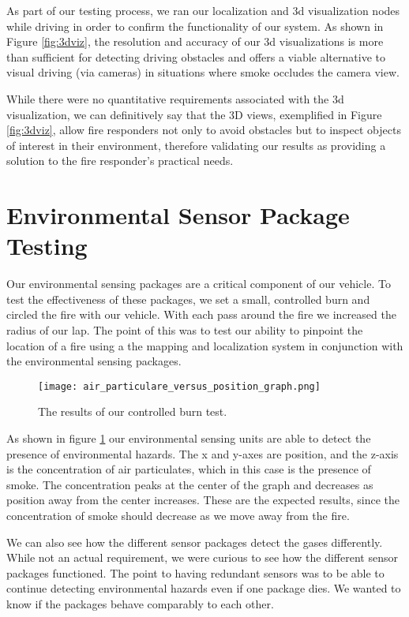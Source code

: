 As part of our testing process, we ran our localization and 3d visualization nodes while driving in order to confirm the functionality of our system. As shown in Figure \ref{fig:3dviz}, the resolution and accuracy of our 3d visualizations is more than sufficient for detecting driving obstacles and offers a viable alternative to visual driving (via cameras) in situations where smoke occludes the camera view.

While there were no quantitative requirements associated with the 3d visualization, we can definitively say that the 3D views, exemplified in Figure \ref{fig:3dviz}, allow fire responders not only to avoid obstacles but to inspect objects of interest in their environment, therefore validating our results as providing a solution to the fire responder's practical needs.

\section{Environmental Sensor Package Testing}
Our environmental sensing packages are a critical component of our vehicle.  To test the effectiveness of these packages, we set a small, controlled burn and circled the fire with our vehicle.  With each pass around the fire we increased the radius of our lap.  The point of this was to test our ability to pinpoint the location of a fire using a the mapping and localization system in conjunction with the environmental sensing packages.

\begin{figure}[H]
\centerline{\texttt{[image: air\_particulare\_versus\_position\_graph.png]}}
\caption[]{The results of our controlled burn test.}
\label{fig:air_particulate_versus_position_graph}
\end{figure}

As shown in figure \ref{fig:air_particulate_versus_position_graph} our environmental sensing units are able to detect the presence of environmental hazards.  The x and y-axes are position, and the z-axis is the concentration of air particulates, which in this case is the presence of smoke.  The concentration peaks at the center of the graph and decreases as position away from the center increases.  These are the expected results, since the concentration of smoke should decrease as we move away from the fire.

We can also see how the different sensor packages detect the gases differently.  While not an actual requirement, we were curious to see how the different sensor packages functioned.  The point to having redundant sensors was to be able to continue detecting environmental hazards even if one package dies.  We wanted to know if the packages behave comparably to each other.


